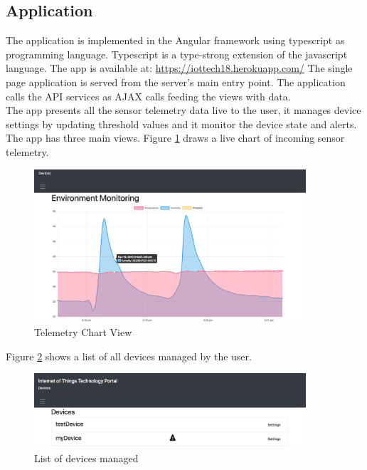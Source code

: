 \subsection{Application}
The application is implemented in the Angular framework using typescript as programming language. Typescript is a type-strong extension of the javascript language. The app is available at: \href{https://iottech18.herokuapp.com/}{https://iottech18.herokuapp.com/} The single page application is served from the server's main entry point. The application calls the API services as AJAX calls feeding the views with data. \\

The app presents all the sensor telemetry data live to the user, it manages device settings by updating threshold values and it monitor the device state and alerts. The app has three main views.
Figure \ref{fig:chartview} draws a live chart of incoming sensor telemetry. 

\begin{figure}[H]
    \centering
    \includegraphics[width=0.9\textwidth]{figures/App/app_dashboard}
    \caption{Telemetry Chart View}
    \label{fig:chartview}
\end{figure}

Figure \ref{fig:devicelist} shows a list of all devices managed by the user. 

\begin{figure}[H]
    \centering
    \includegraphics[width=0.9\textwidth]{figures/App/app_device_list}
    \caption{List of devices managed}
    \label{fig:devicelist}
\end{figure}

